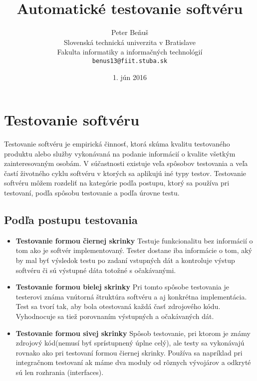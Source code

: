 \documentclass[10pt,twoside,slovak,a4paper]{article}
\title{Automatické testovanie softvéru%
	}
\author{Peter Beňuš\\[2pt]
	{\small Slovenská technická univerzita v Bratislave}\\
	{\small Fakulta informatiky a informačných technológií}\\
	{\small \texttt{benus13@fiit.stuba.sk}}
}
\date{\small 1. jún 2016}
\begin{document}
	
	\maketitle
	
	\section{Testovanie softvéru}
	Testovanie softvéru je empirická činnosť, ktorá skúma kvalitu testovaného produktu alebo služby vykonávaná na podanie informácií o kvalite všetkým zainteresovaným osobám.\cite{Kaner2006} V súčastnosti existuje veľa spôsobov testovania a veľa častí životného cyklu softvéru v ktorých sa aplikujú iné typy testov. Testovanie softvéru môžem rozdeliť na kategórie podľa postupu, ktorý sa používa pri testovaní, podľa spôsobu testovanie a podľa úrovne testu.
	
	\subsection{Podľa postupu testovania}
	\begin{itemize}
		\item \textbf{Testovanie formou čiernej skrinky} \newline
			Testuje funkcionalitu bez informácií o tom ako je softvér implementovaný. Tester dostane iba informácie o tom, aký by mal byť výsledok testu po zadaní vstupných dát a kontroluje výstup softvéru či sú výstupné dáta totožné s očakávanými.\cite{EST2002}
		\item \textbf{Testovanie formou bielej skrinky} \newline
			Pri tomto spôsobe testovania je testerovi známa vnútorná štruktúra softvéru a aj konkrétna implementácia. Test sa tvorí tak, aby bola otestovaná každá časť zdrojového kódu. Vyhodnocuje sa tiež porovnaním výstupných a očakávaných dát.\cite{EST2002}
		\item \textbf{Testovanie formou sivej skrinky} \newline
			Spôsob testovanie, pri ktorom je známy zdrojový kód(nemusí byť sprístupnený úplne celý), ale testy sa vykonávajú rovnako ako pri testovaní formou čiernej skrinky. Používa sa napríklad pri integračnom testovaní ak máme dva moduly od rôznych vývojárov a odkryté sú len rozhrania (interfaces).\cite{EST2002}
	\end{itemize}
	
\end{document}
